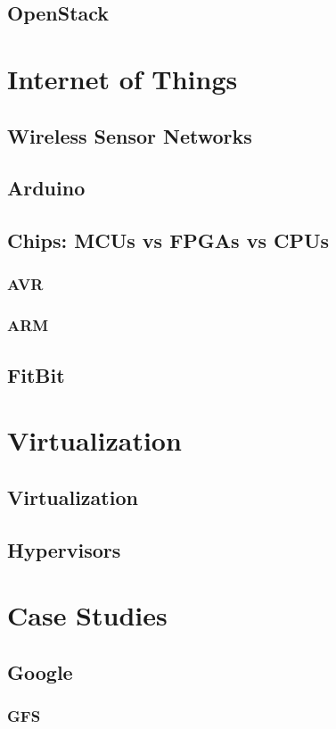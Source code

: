 \documentclass{myproc}
\begin{document}
\subsection{OpenStack}
\bit
\w 
\eit


\section{Internet of Things}
\subsection{Wireless Sensor Networks}
\subsection{Arduino}
\subsection{Chips: MCUs vs FPGAs vs CPUs}
\subsubsection{AVR}
\subsubsection{ARM}

\subsection{FitBit}


\section{Virtualization}
\subsection{Virtualization}
\subsection{Hypervisors}

\section{Case Studies}
\subsection{Google}
\subsubsection{GFS}
\end{document}
